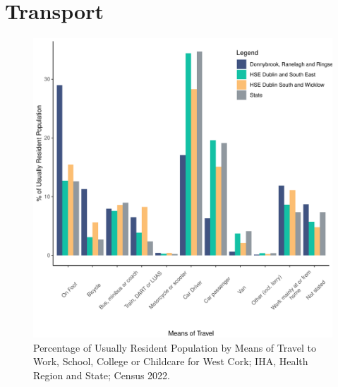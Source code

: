 \documentclass{article}
\begin{document}
\section{Transport}\label{sect:Trans}
\begin{figure}[H]
	\centering
	\includegraphics[width = 120mm]{../figures/TravelED.pdf}
	\caption{Percentage of Usually Resident Population by Means of Travel to Work, School, College or Childcare for West Cork; IHA, Health Region and State; Census 2022.}
	\label{fig:vbnv}
	\end{figure}
\end{document}
